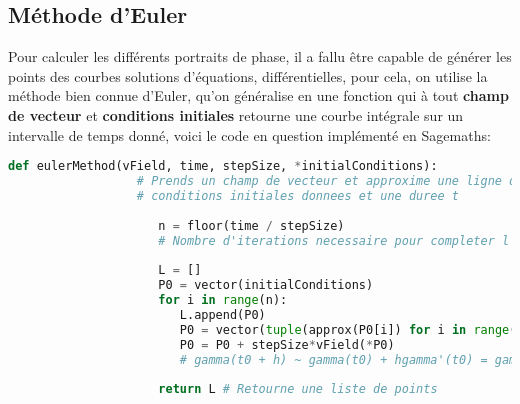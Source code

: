 \documentclass{report}
\begin{document}
      \subsection{Méthode d'Euler}
         Pour calculer les différents portraits de phase, il a fallu être capable de générer les points des courbes solutions d'équations, différentielles, pour cela, on utilise la méthode bien connue d'Euler, qu'on généralise en une fonction qui à tout \textbf{champ de vecteur} et \textbf{conditions initiales} retourne une courbe intégrale sur un intervalle de temps donné, voici le code en question implémenté en Sagemaths:
         \begin{center}
            \begin{lstlisting}[language=Python, caption=Méthode d'Euler générale]
                  def eulerMethod(vField, time, stepSize, *initialConditions): 
                  # Prends un champ de vecteur et approxime une ligne de flot pour des
                  # conditions initiales donnees et une duree t
                  
                     n = floor(time / stepSize)     
                     # Nombre d'iterations necessaire pour completer l'intervalle de temps
                  
                     L = []
                     P0 = vector(initialConditions)
                     for i in range(n):
                        L.append(P0)
                        P0 = vector(tuple(approx(P0[i]) for i in range(len(initialConditions))))  
                        P0 = P0 + stepSize*vField(*P0) 
                        # gamma(t0 + h) ~ gamma(t0) + hgamma'(t0) = gamma(t0) + hF(gamma(t0))
                     
                     return L # Retourne une liste de points
               \end{lstlisting}
         \end{center}
      \pagebreak
\end{document}
